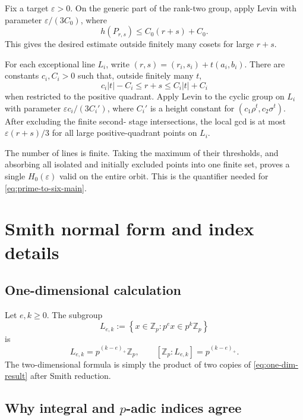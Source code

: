 \documentclass[11pt,oneside]{article}
\theoremstyle{definition}
\newcommand{\Z}{\mathbb{Z}}
\newcommand{\eps}{\varepsilon}
\newcommand{\set}[1]{\left\{#1\right\}}
\begin{document}
Fix a target $\eps>0$.  On the generic part of the rank-two group, apply
Levin with parameter $\eps/(3C_0)$, where
\begin{equation}\label{eq:height-C0}
  h(P_{r,s})\le C_0(r+s)+C_0.
\end{equation}
This gives the desired estimate outside finitely many cosets for large
$r+s$.

For each exceptional line $L_i$, write $(r,s)=(r_i,s_i)+t(a_i,b_i)$.
There are constants $c_i,C_i>0$ such that, outside finitely many $t$,
\begin{equation}\label{eq:t-height-equivalence}
  c_i|t|-C_i\le r+s\le C_i|t|+C_i
\end{equation}
when restricted to the positive quadrant.  Apply Levin to the cyclic
group on $L_i$ with parameter $\eps c_i/(3C_i')$, where $C_i'$ is a height
constant for $(c_1\rho^t,c_2\sigma^t)$.  After excluding the finite second-
stage intersections, the local gcd is at most $\eps(r+s)/3$ for all large
positive-quadrant points on $L_i$.

The number of lines is finite.  Taking the maximum of their thresholds,
and absorbing all isolated and initially excluded points into one finite
set, proves a single $H_0(\eps)$ valid on the entire orbit.  This is the
quantifier needed for \eqref{eq:prime-to-six-main}.

\section{Smith normal form and index details}\label{app:smith}

\subsection{One-dimensional calculation}

Let $e,k\ge0$.  The subgroup
\begin{equation}\label{eq:one-dim-preimage}
  L_{e,k}:=\set{x\in\Z_p:p^ex\in p^k\Z_p}
\end{equation}
is
\begin{equation}\label{eq:one-dim-result}
  L_{e,k}=p^{(k-e)_+}\Z_p,
  \qquad
  [\Z_p:L_{e,k}]=p^{(k-e)_+}.
\end{equation}
The two-dimensional formula is simply the product of two copies of
\eqref{eq:one-dim-result} after Smith reduction.

\subsection{Why integral and $p$-adic indices agree}
\end{document}
